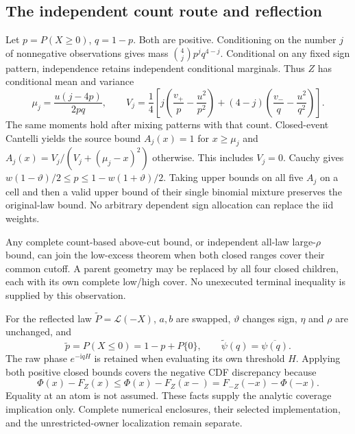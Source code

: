 \subsection{The independent count route and reflection}
Let $p=P(X\ge0)$, $q=1-p$. Both are positive. Conditioning on the
number $j$ of nonnegative observations gives mass $\binom4j p^jq^{4-j}$.
Conditional on any fixed sign pattern, independence retains independent
conditional marginals. Thus $Z$ has conditional mean and variance
\[
 \mu_j=\frac{u(j-4p)}{2pq},\qquad
 V_j=\frac14\left[j\left(\frac{v_+}{p}-\frac{u^2}{p^2}\right)
 +(4-j)\left(\frac{v_-}{q}-\frac{u^2}{q^2}\right)\right].
\]
The same moments hold after mixing patterns with that count. Closed-event
Cantelli yields the source bound $A_j(x)=1$ for $x\ge\mu_j$ and
$A_j(x)=V_j/(V_j+(\mu_j-x)^2)$ otherwise. This includes $V_j=0$.
Cauchy gives
$w(1-\vartheta)/2\le p\le1-w(1+\vartheta)/2$.
Taking upper bounds on all five $A_j$ on a cell and then a valid upper
bound of their single binomial mixture preserves the original-law bound.
No arbitrary dependent sign allocation can replace the iid weights.

Any complete count-based above-cut bound, or independent all-law
large-$\rho$ bound, can join the low-excess theorem when both closed
ranges cover their common cutoff. A parent geometry may be replaced by
all four closed children, each with its own complete low/high cover.
No unexecuted terminal inequality is supplied by this observation.

For the reflected law $\widetilde P=\mathcal L(-X)$, $a,b$ are swapped,
$\vartheta$ changes sign, $\eta$ and $\rho$ are unchanged, and
\[
 \widetilde p=P(X\le0)=1-p+P\{0\},\qquad
 \widetilde\psi(q)=\overline{\psi(q)}.
\]
The raw phase $e^{-\mathrm iqH}$ is retained when evaluating its own
threshold $H$. Applying both positive closed bounds covers the negative
CDF discrepancy because
\[
 \Phi(x)-F_Z(x)\le\Phi(x)-F_Z(x-)
     =F_{-Z}(-x)-\Phi(-x).
\]
Equality at an atom is not assumed. These facts supply the analytic
coverage implication only. Complete numerical enclosures, their selected
implementation, and the unrestricted-owner localization remain separate.
